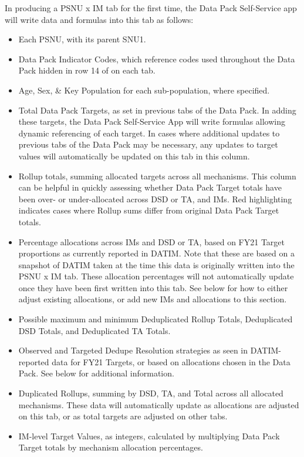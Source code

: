 \documentclass[
  openany]{book}
\begin{document}
In producing a PSNU x IM tab for the first time, the Data Pack
Self-Service app will write data and formulas into this tab as follows:

\begin{itemize}
\item
  Each PSNU, with its parent SNU1.
\item
  Data Pack Indicator Codes, which reference codes used throughout the
  Data Pack hidden in row 14 of on each tab.
\item
  Age, Sex, \& Key Population for each sub-population, where specified.
\item
  Total Data Pack Targets, as set in previous tabs of the Data Pack.
  In adding these targets, the Data Pack Self-Service App will write
  formulas allowing dynamic referencing of each target. In cases where
  additional updates to previous tabs of the Data Pack may be
  necessary, any updates to target values will automatically be
  updated on this tab in this column.
\item
  Rollup totals, summing allocated targets across all mechanisms. This
  column can be helpful in quickly assessing whether Data Pack Target
  totals have been over- or under-allocated across DSD or TA, and IMs.
  Red highlighting indicates cases where Rollup sums differ from
  original Data Pack Target totals.
\item
  Percentage allocations across IMs and DSD or TA, based on FY21
  Target proportions as currently reported in DATIM. Note that these
  are based on a snapshot of DATIM taken at the time this data is
  originally written into the PSNU x IM tab. These allocation
  percentages will not automatically update once they have been first
  written into this tab. See below for how to either adjust existing
  allocations, or add new IMs and allocations to this section.
\item
  Possible maximum and minimum Deduplicated Rollup Totals,
  Deduplicated DSD Totals, and Deduplicated TA Totals.
\item
  Observed and Targeted Dedupe Resolution strategies as seen in
  DATIM-reported data for FY21 Targets, or based on allocations chosen
  in the Data Pack. See below for additional information.
\item
  Duplicated Rollups, summing by DSD, TA, and Total across all
  allocated mechanisms. These data will automatically update as
  allocations are adjusted on this tab, or as total targets are
  adjusted on other tabs.
\item
  IM-level Target Values, as integers, calculated by multiplying Data
  Pack Target totals by mechanism allocation percentages.
\end{itemize}
\end{document}

